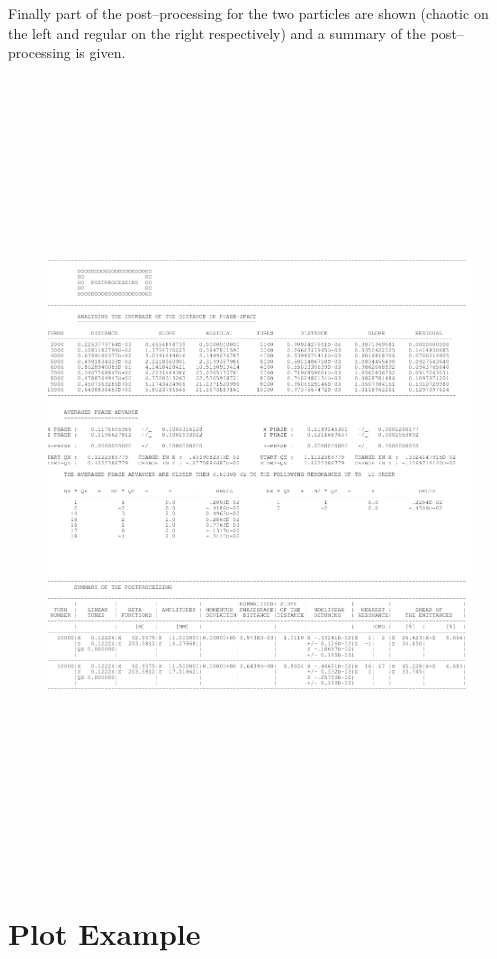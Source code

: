 \documentclass[a4paper,11pt]{report}
\begin{document}
\clearpage

Finally part of the post--processing for the two particles are shown
(chaotic on the left and regular on the right respectively) and a
summary of the post--processing is given.
\begin{figure}[H]
\begin{center}
  \mbox{\includegraphics[width=16cm,height=21cm]{expout4}}
\end{center}
\end{figure}

\clearpage

\section{Plot Example} \label{plots}
\end{document}

